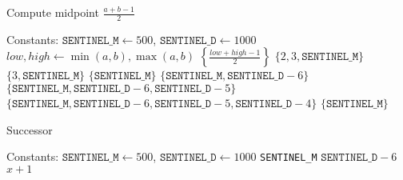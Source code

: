 \begin{algorithm}
\caption{Compute midpoint \( \frac{a + b -1}{2} \)}
\label{alg:midpoint}
\begin{algorithmic}[1]
\Require Constants: $\texttt{SENTINEL\_M} \gets 500$, $\texttt{SENTINEL\_D} \gets 1000$
    \State $low, high \gets \min(a, b), \max(a, b)$
        \State \Return $\left\{ \frac{low + high - 1}{2} \right\}$
            \State \Return $\{2, 3, \texttt{SENTINEL\_M}\}$
            \State \Return $\{3, \texttt{SENTINEL\_M}\}$
        \EndIf
            \State \Return $\{\texttt{SENTINEL\_M}\}$
            \State \Return $\{\texttt{SENTINEL\_M}, \texttt{SENTINEL\_D} - 6\}$
            \State \Return $\{\texttt{SENTINEL\_M}, \texttt{SENTINEL\_D} - 6, \texttt{SENTINEL\_D} - 5\}$
            \State \Return $\{\texttt{SENTINEL\_M}, \texttt{SENTINEL\_D} - 6, \texttt{SENTINEL\_D} - 5, \texttt{SENTINEL\_D} - 4\}$
        \EndIf
    \EndIf
    \State \Return $\{\texttt{SENTINEL\_M}\}$
\EndFunction
\end{algorithmic}
\end{algorithm}

\begin{algorithm}
\caption{Successor}
\label{alg:succ}
\begin{algorithmic}[1]
\Require Constants: $\texttt{SENTINEL\_M} \gets 500$, $\texttt{SENTINEL\_D} \gets 1000$
    \State \Return \texttt{SENTINEL\_M}
    \State \Return $\texttt{SENTINEL\_D} - 6$
\Else
    \State \Return $x + 1$
\EndIf
\EndFunction
\end{algorithmic}
\end{algorithm}

